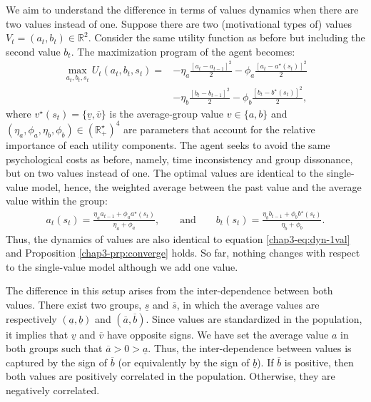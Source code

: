 We aim to understand the difference in terms of values dynamics when there are two values instead of one. Suppose there are two (motivational types of) values $V_t = (a_t, b_t)\in\mathbb{R}^2$. Consider the same utility function as before but including the second value $b_t$. The maximization program of the agent becomes:
\begin{equation}\label{chap3-eq:maxU-2val}
    \begin{split}
        \max_{a_t, b_t, s_t} U_t(a_t, b_t, s_t) = &-\eta_a\frac{\left[a_t-a_{t-1}\right]^2}{2} -\phi_a\frac{\left[a_t-a^\star(s_t)\right]^2}{2}\\
        &-\eta_b\frac{\left[b_t-b_{t-1}\right]^2}{2} -\phi_b\frac{\left[b_t-b^\star(s_t)\right]^2}{2},
    \end{split}
\end{equation}
where $v^\star(s_t) = \{\underline{v}, \overline{v}\}$ is the average-group value $v\in\{a,b\}$ and $(\eta_a, \phi_a, \eta_b, \phi_b)\in (\mathbb{R}^\star_{+})^4$ are parameters that account for the relative importance of each utility components. 
%
The agent seeks to avoid the same psychological costs as before, namely, time inconsistency and group dissonance, but on two values instead of one. The optimal values are identical to the single-value model, hence, the weighted average between the past value and the average value within the group:
\begin{align*}
    a_t(s_t) =  \frac{\eta_a a_{t-1} + \phi_a a^\star(s_t)}{\eta_a + \phi_a}, \hspace{2em} \text{and} \hspace{2em}%
    b_t(s_t) =  \frac{\eta_b b_{t-1} + \phi_b b^\star(s_t)}{\eta_b + \phi_b}.%
\end{align*}
Thus, the dynamics of values are also identical to equation \eqref{chap3-eq:dyn-1val} and Proposition \ref{chap3-prp:converge} holds. So far, nothing changes with respect to the single-value model although we add one value.

The difference in this setup arises from the inter-dependence between both values. There exist two groups, $\underline{s}$ and $\overline{s}$, in which the average values are respectively $(\underline{a}, \underline{b})$ and $(\overline{a}, \overline{b})$.
Since values are standardized in the population, it implies that $\underline{v}$ and $\overline{v}$ have opposite signs. 
%
We have set the average value $a$ in both groups such that $\overline{a} > 0 > \underline{a}$.
%
Thus, the inter-dependence between values is captured by the sign of $\overline{b}$ (or equivalently by the sign of $\underline{b}$). If $\overline{b}$ is positive, then both values are positively correlated in the population. Otherwise, they are negatively correlated. 

